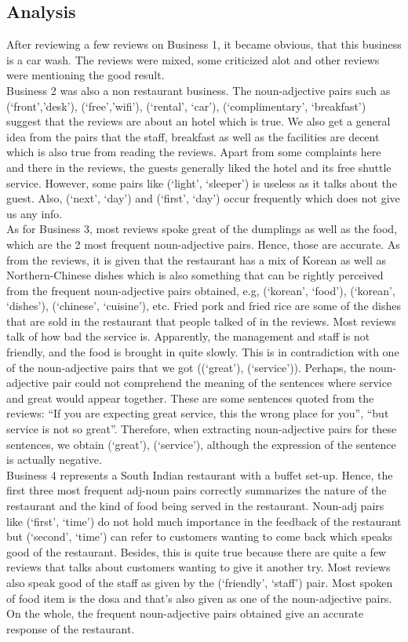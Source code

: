\subsection{Analysis}
After reviewing a few reviews on Business 1, it became obvious, that this business is a car wash. The reviews were mixed, some criticized alot and other reviews were mentioning the good result. \\
Business 2 was also a non restaurant business. The noun-adjective pairs such as (‘front’,’desk’), (‘free’,’wifi’), (‘rental’, ‘car’), (‘complimentary’, ‘breakfast’) suggest that the reviews are about an hotel which is true. We also get a general idea from the pairs that the staff, breakfast as well as the facilities are decent which is also true from reading the reviews. Apart from some complaints here and there in the reviews, the guests generally liked the hotel and its free shuttle service. However, some pairs like (‘light’, ‘sleeper’) is useless as it talks about the guest. Also, (‘next’, ‘day’) and (‘first’, ‘day’) occur frequently which does not give us any info.\\
As for Business 3, most reviews spoke great of the dumplings as well as the food, which are the 2 most frequent noun-adjective pairs. Hence, those are accurate. As from the reviews, it is given that the restaurant has a mix of Korean as well as Northern-Chinese dishes which is also something that can be rightly perceived from the frequent noun-adjective pairs obtained, e.g, (‘korean’, ‘food’), (‘korean’, ‘dishes’), (‘chinese’, ‘cuisine’), etc. Fried pork and fried rice are some of the dishes that are sold in the restaurant that people talked of in the reviews. Most reviews talk of how bad the service is. Apparently, the management and staff is not friendly, and the food is brought in quite slowly. This is in contradiction with one of the noun-adjective pairs that we got ((‘great’), (‘service’)).  Perhaps, the noun-adjective pair could not comprehend the meaning of the sentences where service and great would appear together. These are some sentences quoted from the reviews: “If you are expecting great service, this the wrong place for you”, “but service is not so great”.  Therefore, when extracting noun-adjective pairs for these sentences, we obtain (‘great’), (‘service’), although the expression of the sentence is actually negative.\\
Business 4 represents a South Indian restaurant with a buffet set-up. Hence, the first three most frequent adj-noun pairs correctly summarizes the nature of the restaurant and the kind of food being served in the restaurant. Noun-adj pairs like (‘first’, ‘time’) do not hold much importance in the feedback of the restaurant but (‘second’, ‘time’) can refer to customers wanting to come back which speaks good of the restaurant. Besides, this is quite true because there are quite a few reviews that talks about customers wanting to give it another try. Most reviews also speak good of the staff as given by the (‘friendly’, ‘staff’) pair. Most spoken of food item is the dosa and that’s also given as one of the noun-adjective pairs. On the whole, the frequent noun-adjective pairs obtained give an accurate response of the restaurant.\\
